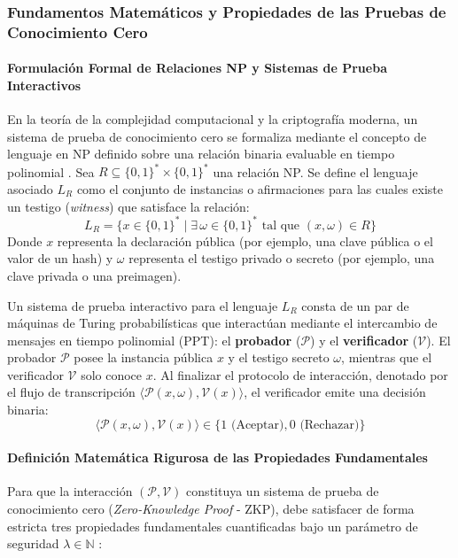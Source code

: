 \subsubsection{Fundamentos Matemáticos y Propiedades de las Pruebas de Conocimiento Cero}

\paragraph{Formulación Formal de Relaciones NP y Sistemas de Prueba Interactivos}
En la teoría de la complejidad computacional y la criptografía moderna, un sistema de prueba de conocimiento cero se formaliza mediante el concepto de lenguaje en NP definido sobre una relación binaria evaluable en tiempo polinomial \cite{goldwasser1989knowledge}. Sea $R \subseteq \{0,1\}^* \times \{0,1\}^*$ una relación NP. Se define el lenguaje asociado $L_R$ como el conjunto de instancias o afirmaciones para las cuales existe un testigo (\textit{witness}) que satisface la relación:
\begin{equation}
L_R = \{ x \in \{0,1\}^* \mid \exists \, \omega \in \{0,1\}^* \text{ tal que } (x, \omega) \in R \}
\end{equation}
Donde $x$ representa la declaración pública (por ejemplo, una clave pública o el valor de un hash) y $\omega$ representa el testigo privado o secreto (por ejemplo, una clave privada o una preimagen).

Un sistema de prueba interactivo para el lenguaje $L_R$ consta de un par de máquinas de Turing probabilísticas que interactúan mediante el intercambio de mensajes en tiempo polinomial (PPT): el \textbf{probador} ($\mathcal{P}$) y el \textbf{verificador} ($\mathcal{V}$). El probador $\mathcal{P}$ posee la instancia pública $x$ y el testigo secreto $\omega$, mientras que el verificador $\mathcal{V}$ solo conoce $x$. Al finalizar el protocolo de interacción, denotado por el flujo de transcripción $\langle \mathcal{P}(x, \omega), \mathcal{V}(x) \rangle$, el verificador emite una decisión binaria:
\begin{equation}
\langle \mathcal{P}(x, \omega), \mathcal{V}(x) \rangle \in \{1 \text{ (Aceptar)}, 0 \text{ (Rechazar)}\}
\end{equation}

\paragraph{Definición Matemática Rigurosa de las Propiedades Fundamentales}
Para que la interacción $(\mathcal{P}, \mathcal{V})$ constituya un sistema de prueba de conocimiento cero (\textit{Zero-Knowledge Proof} - ZKP), debe satisfacer de forma estricta tres propiedades fundamentales cuantificadas bajo un parámetro de seguridad $\lambda \in \mathbb{N}$ \cite{goldwasser1989knowledge, badiezadegan2026complexity}:

